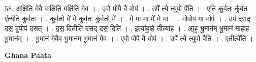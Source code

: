 \documentclass[17pt]{extarticle}
\begin{document}
58. अक्षि॑ति मे॒वै वाक्षि॑ति॒ मक्षि॑ति मे॒व । . ए॒वो पोपै॒ वै वोप॑ । . उपै᳚ त्ये॒ त्युपो पै॑ति । . ए॒ति॒ कु॒र्व॒तः कु॑र्व॒त ए᳚त्येति कुर्व॒तः । . कु॒र्व॒तो मे॑ मे कुर्व॒तः कु॑र्व॒तो मे᳚ । . मे॒ मा मा मे॑ मे॒ मा । . मोपोप॒ मा मोप॑ । . उप॑ दसद् दस॒ दुपोप॑ दसत् । . द॒स॒ दितीति॑ दसद् दस॒ दिति॑ । . इत्या॑हा॒हे तीत्या॑ह । . आ॒ह॒ भू॒मान॑म् भू॒मान॑ माहाह भू॒मान᳚म् । . भू॒मान॑ मे॒वैव भू॒मान॑म् भू॒मान॑ मे॒व । . ए॒वो पोपै॒ वै वोप॑ । . उपै᳚ त्ये॒ त्युपो पै॑ति । . ए॒तीत्ये॑ति । \newline

\textbf{Ghana Paata } \newline
\end{document}

